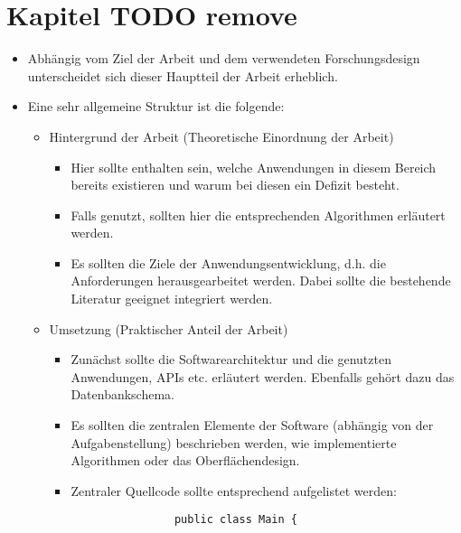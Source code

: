 %
\chapter{Kapitel TODO remove}
\label{chap:chapters} 

\begin{itemize}
	\item Abhängig vom Ziel der Arbeit und dem verwendeten Forschungsdesign unterscheidet sich dieser Hauptteil der Arbeit erheblich. 
	\item Eine sehr allgemeine Struktur ist die folgende:
	\begin{itemize}
		\item Hintergrund der Arbeit (Theoretische Einordnung der Arbeit) 
		 	\begin{itemize}
		 		\item Hier sollte enthalten sein, welche Anwendungen in diesem Bereich bereits existieren und warum bei diesen ein Defizit besteht. 
				\item Falls genutzt, sollten hier die entsprechenden Algorithmen erläutert werden.
				\item Es sollten die Ziele der Anwendungsentwicklung, d.h. die Anforderungen herausgearbeitet werden. Dabei sollte die bestehende Literatur geeignet integriert werden.
		 	\end{itemize}
		\item Umsetzung (Praktischer Anteil der Arbeit)
			\begin{itemize}
				\item Zunächst sollte die Softwarearchitektur und die genutzten Anwendungen, APIs etc. erläutert werden. Ebenfalls gehört dazu das Datenbankschema.
				\item Es sollten die zentralen Elemente der Software (abhängig von der Aufgabenstellung) beschrieben werden, wie implementierte Algorithmen oder das Oberflächendesign.
				\item Zentraler Quellcode sollte entsprechend aufgelistet werden:
				\lstset{language=Java,basicstyle=\footnotesize,numbers=left,showstringspaces=false,frame=single}
				\begin{lstlisting}
				public class Main {

\end{lstlisting}
\end{itemize}
\end{itemize}
\end{itemize}
